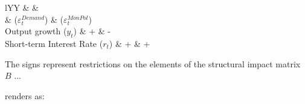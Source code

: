 \documentclass[11pt,a4paper]{article}
\begin{document}
\begin{democode}
\begin{table}[ht!]
    \centering
    \begin{minipage}[b]{.7\textwidth}
        \begin{center}\small
        \begin{tabularx}{\textwidth}{lYY}
        \toprule
            &  &  \\
            & ($\varepsilon_{t}^{Demand}$) & ($\varepsilon_{t}^{MonPol}$) \\ \midrule\addlinespace
            Output growth ($y_{t}$)             & + & - \\
            Short-term Interest Rate ($r_{t}$)  & + & + \\ \bottomrule
        \end{tabularx}%
        \end{center}
        \vspace{0.4cm}
        \caption{\scshape{Sign Restrictions for Demand Shock \\ and Monetary Policy Shock}}
        \vspace{0.2cm}
        { The signs represent restrictions on the
        elements of the structural impact matrix $B$ ...}
        \label{tab:SR}
    \end{minipage}
\end{table}
\end{democode}

\noindent renders as:
\end{document}
